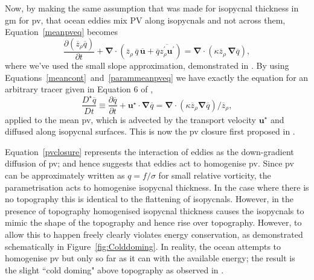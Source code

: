 \documentclass[10pt,a4paper]{report}
\newcommand*\mean[1]{\overline{#1}}
\newcommand*\res[1]{{#1}^{\prime}}
\newcommand*\figref[1]{Figure~\ref{#1}}
\newcommand*\equref[1]{Equation~\eqref{#1}}
\begin{document}
                Now, by making the same assumption that was made for isopycnal thickness in 
                \gls{gm} for \gls{pv}, that ocean eddies mix PV along isopycnals and not
                across them, \equref{meanpveq} becomes
                \begin{equation}
                \frac{\partial \left(\mean{z}_{\rho} \mean{q}\right)}{\partial t} +
                \boldsymbol{\nabla}\cdot\left(\mean{z}_{\rho}\,\mean{q}\,\mean{\boldsymbol{u}}+\mean{q}\mean{\res{z}_{\rho} \res{\boldsymbol{u}}}\right)
                = \boldsymbol{\nabla}\cdot\left(\kappa \mean{z}_{\rho}\,\boldsymbol{\nabla}\mean{q}\right) ,
                \label{parammeanpveq}
                \end{equation}
                where we've used the small slope approximation, demonstrated in \cite{gent1990}. By using Equations~\ref{meancont}~and~\ref{parammeanpveq} we have exactly the equation for an arbitrary tracer given in Equation 6 of \cite{gent1995parameterizing},
                \begin{equation}
                \frac{D^\star \mean{q}}{D t}\equiv\frac{\partial \mean{q}}{\partial t} + \boldsymbol{u}^\star\cdot\boldsymbol{\nabla}\mean{q} = \boldsymbol{\nabla}\cdot
                \left(\kappa \mean{z}_{\rho}\boldsymbol{\nabla} \mean{q} \right)/\mean{z}_{\rho} ,
                \label{pvclosure}
                \end{equation}
                applied to the mean \gls{pv}, which is advected by the transport velocity $\boldsymbol{u}^\star$ and diffused along isopycnal surfaces. This is now
                the \gls{pv} closure first proposed in \cite{greatbatch1998exploring}.
                
                \equref{pvclosure} represents the interaction of eddies as the
                down-gradient diffusion of \gls{pv}; and hence suggests that eddies
                act to homogenise \gls{pv}. Since \gls{pv} can be approximately written
                as $q=f/\sigma$ for small relative vorticity, the parametrisation acts  to homogenise isopycnal thickness. In the case 
                where there is no topography this is identical to the flattening of isopycnals.
                However, in the presence of topography homogenised isopycnal thickness
                causes the isopycnals to mimic the shape of the topography and hence 
                rise over topography. However, to allow this to happen freely
                clearly violates energy conservation, as demonstrated schematically in 
                \figref{fig:Colddoming}. In reality, the ocean attempts to 
                homogenise \gls{pv} but only so far as it can with the available energy;
                the result is the slight ``cold doming" above topography as observed in
                \cite{adcock2000interactions}. 
                
\end{document}
